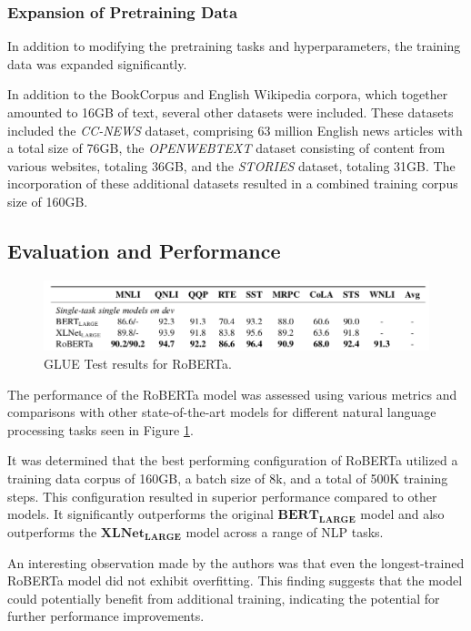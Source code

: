 \documentclass[12pt,oneside,bibtotoc,liststotoc]{scrbook}
\begin{document}
\subsubsection{Expansion of Pretraining Data}
In addition to modifying the pretraining tasks and hyperparameters, the training data was expanded significantly.

In addition to the BookCorpus and English Wikipedia corpora, which together amounted to 16GB of text, several other datasets were included. These datasets included the \textit{CC-NEWS} dataset, comprising 63 million English news articles with a total size of 76GB, the \textit{OPENWEBTEXT} dataset consisting of content from various websites, totaling 36GB, and the \textit{STORIES} dataset, totaling 31GB. The incorporation of these additional datasets resulted in a combined training corpus size of 160GB. \cite{roberta}

\subsection{Evaluation and Performance}
\begin{figure}
  \centering
  \includegraphics[width=12cm]{img/roberta_results.png}
  \caption{GLUE Test results for RoBERTa. \cite{roberta}}
  \label{fig:roberta_results}
\end{figure}
The performance of the RoBERTa model was assessed using various metrics and comparisons with other state-of-the-art models for different natural language processing tasks seen in Figure \ref{fig:roberta_results}.

It was determined that the best performing configuration of RoBERTa utilized a training data corpus of 160GB, a batch size of 8k, and a total of 500K training steps. This configuration resulted in superior performance compared to other models. It significantly outperforms the original $\mathbf{BERT_{LARGE}}$ model and also outperforms the $\mathbf{XLNet_{LARGE}}$ model across a range of NLP tasks.

An interesting observation made by the authors was that even the longest-trained RoBERTa model did not exhibit overfitting. This finding suggests that the model could potentially benefit from additional training, indicating the potential for further performance improvements.
\end{document}
